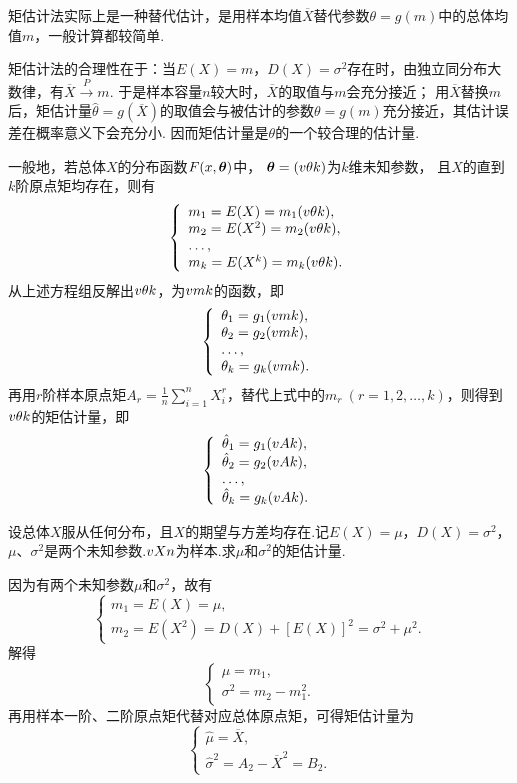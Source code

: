矩估计法实际上是一种替代估计，是用样本均值\(\overline{X}\)替代参数\(\theta=g(m)\)中的总体均值\(m\)，一般计算都较简单.

矩估计法的合理性在于：当\(E(X)=m\)，\(D(X)=\sigma^2\)存在时，由独立同分布大数律，有\(\overline{X} \overset{P}{\longrightarrow} m\).
于是样本容量\(n\)较大时，\(\overline{X}\)的取值与\(m\)会充分接近；
用\(\overline{X}\)替换\(m\)后，矩估计量\(\hat{\theta}=g(\overline{X})\)的取值会与被估计的参数\(\theta=g(m)\)充分接近，其估计误差在概率意义下会充分小.
因而矩估计量是\(\theta\)的一个较合理的估计量.

一般地，若总体\(X\)的分布函数\(F(x,\boldsymbol{\theta})\)中，%
\(\boldsymbol{\theta}=(v{\theta}{k})\)为\(k\)维未知参数，%
且\(X\)的直到\(k\)阶原点矩均存在，则有\[
\def\m#1{m_{#1} = E(X\ifthenelse{\equal{#1}{1}}{}{^{#1}}) = m_{#1}(\v{\theta}{k})}
\left\{ \begin{array}{l}
\m{1}, \\
\m{2}, \\
\dots, \\
\m{k}. \\
\end{array} \right.
\]
从上述方程组反解出\(v{\theta}{k}\)，为\(v{m}{k}\)的函数，即\[
\def\g#1{\theta_{#1}=g_{#1}(\v{m}{k})}
\left\{ \begin{array}{l}
\g{1}, \\
\g{2}, \\
\dots, \\
\g{k}. \\
\end{array} \right.
\]
再用\(r\)阶样本原点矩\(A_r = \frac{1}{n} \sum\limits_{i=1}^n{X_i^r}\)，替代上式中的\(m_r\ (r=1,2,\dots,k)\)，则得到\(v{\theta}{k}\)的矩估计量，即\[
\def\g#1{\hat{\theta}_{#1}=g_{#1}(\v{A}{k})}
\left\{ \begin{array}{l}
\g{1}, \\
\g{2}, \\
\dots, \\
\g{k}. \\
\end{array} \right.
\]

\begin{example}
设总体\(X\)服从任何分布，且\(X\)的期望与方差均存在.记\(E(X)=\mu\)，\(D(X)=\sigma^2\)，\(\mu\)、\(\sigma^2\)是两个未知参数.\(v{X}{n}\)为样本.求\(\mu\)和\(\sigma^2\)的矩估计量.
\begin{solution}
因为有两个未知参数\(\mu\)和\(\sigma^2\)，故有\[
\left\{ \begin{array}{l}
m_1=E(X)=\mu, \\
m_2=E(X^2)=D(X)+[E(X)]^2=\sigma^2+\mu^2.
\end{array} \right.
\]
解得\[
\left\{ \begin{array}{l}
\mu=m_1, \\
\sigma^2=m_2-m_1^2.
\end{array} \right.
\]再用样本一阶、二阶原点矩代替对应总体原点矩，可得矩估计量为\[
\left\{ \begin{array}{l}
\hat{\mu}=\overline{X}, \\
\hat{\sigma}^2=A_2-\overline{X}^2=B_2.
\end{array} \right.
\]
\end{solution}
\end{example}

